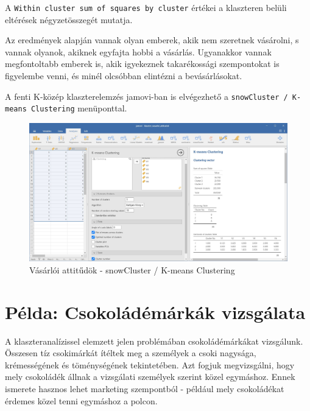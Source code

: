 \documentclass[
  letterpaper,
]{krantz}
\begin{document}
A \texttt{Within\ cluster\ sum\ of\ squares\ by\ cluster} értékei a
klaszteren belüli eltérések négyzetösszegét mutatja.

Az eredmények alapján vannak olyan emberek, akik nem szeretnek
vásárolni, s vannak olyanok, akiknek egyfajta hobbi a vásárlás.
Ugyanakkor vannak megfontoltabb emberek is, akik igyekeznek
takarékossági szempontokat is figyelembe venni, és minél olcsóbban
elintézni a bevásárlásokat.

A fenti K-közép klaszterelemzés jamovi-ban is elvégezhető a
\texttt{snowCluster\ /\ K-means\ Clustering} menüponttal.

\begin{figure}

{\centering \includegraphics{./images/klaszter_vasarloi_attitudok_01.jpg}

}

\caption{Vásárlói attitűdök - snowCluster / K-means Clustering}

\end{figure}

\hypertarget{puxe9lda-csokoluxe1duxe9muxe1rkuxe1k-vizsguxe1lata}{%
\section{Példa: Csokoládémárkák
vizsgálata}\label{puxe9lda-csokoluxe1duxe9muxe1rkuxe1k-vizsguxe1lata}}

A klaszteranalízissel elemzett jelen problémában csokoládémárkákat
vizsgálunk. Összesen tíz csokimárkát ítéltek meg a személyek a csoki
nagysága, krémességének és töménységének tekintetében. Azt fogjuk
megvizsgálni, hogy mely csokoládék állnak a vizsgálati személyek szerint
közel egymáshoz. Ennek ismerete hasznos lehet marketing szempontból -
például mely csokoládékat érdemes közel tenni egymáshoz a polcon.
\end{document}
